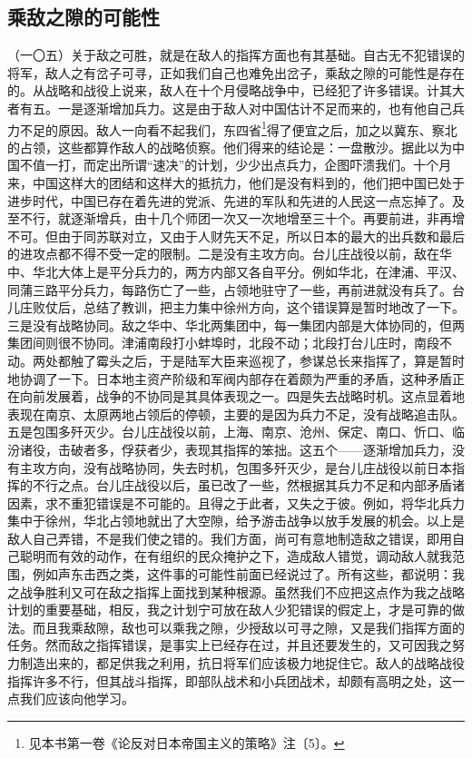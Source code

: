 \documentclass[cn,11pt,chinese]{elegantbook}
\def\myformat#1{\hfil\hfil #1}
\begin{document}
\subsection*{\myformat{乘敌之隙的可能性}}
（一〇五）关于敌之可胜，就是在敌人的指挥方面也有其基础。自古无不犯错误的将军，敌人之有岔子可寻，正如我们自己也难免出岔子，乘敌之隙的可能性是存在的。从战略和战役上说来，敌人在十个月侵略战争中，已经犯了许多错误。计其大者有五。一是逐渐增加兵力。这是由于敌人对中国估计不足而来的，也有他自己兵力不足的原因。敌人一向看不起我们，东四省\footnote[40]{ 见本书第一卷《论反对日本帝国主义的策略》注〔5〕。}得了便宜之后，加之以冀东、察北的占领，这些都算作敌人的战略侦察。他们得来的结论是：一盘散沙。据此以为中国不值一打，而定出所谓“速决”的计划，少少出点兵力，企图吓溃我们。十个月来，中国这样大的团结和这样大的抵抗力，他们是没有料到的，他们把中国已处于进步时代，中国已存在着先进的党派、先进的军队和先进的人民这一点忘掉了。及至不行，就逐渐增兵，由十几个师团一次又一次地增至三十个。再要前进，非再增不可。但由于同苏联对立，又由于人财先天不足，所以日本的最大的出兵数和最后的进攻点都不得不受一定的限制。二是没有主攻方向。台儿庄战役以前，敌在华中、华北大体上是平分兵力的，两方内部又各自平分。例如华北，在津浦、平汉、同蒲三路平分兵力，每路伤亡了一些，占领地驻守了一些，再前进就没有兵了。台儿庄败仗后，总结了教训，把主力集中徐州方向，这个错误算是暂时地改了一下。三是没有战略协同。敌之华中、华北两集团中，每一集团内部是大体协同的，但两集团间则很不协同。津浦南段打小蚌埠时，北段不动；北段打台儿庄时，南段不动。两处都触了霉头之后，于是陆军大臣来巡视了，参谋总长来指挥了，算是暂时地协调了一下。日本地主资产阶级和军阀内部存在着颇为严重的矛盾，这种矛盾正在向前发展着，战争的不协同是其具体表现之一。四是失去战略时机。这点显着地表现在南京、太原两地占领后的停顿，主要的是因为兵力不足，没有战略追击队。五是包围多歼灭少。台儿庄战役以前，上海、南京、沧州、保定、南口、忻口、临汾诸役，击破者多，俘获者少，表现其指挥的笨拙。这五个——逐渐增加兵力，没有主攻方向，没有战略协同，失去时机，包围多歼灭少，是台儿庄战役以前日本指挥的不行之点。台儿庄战役以后，虽已改了一些，然根据其兵力不足和内部矛盾诸因素，求不重犯错误是不可能的。且得之于此者，又失之于彼。例如，将华北兵力集中于徐州，华北占领地就出了大空隙，给予游击战争以放手发展的机会。以上是敌人自己弄错，不是我们使之错的。我们方面，尚可有意地制造敌之错误，即用自己聪明而有效的动作，在有组织的民众掩护之下，造成敌人错觉，调动敌人就我范围，例如声东击西之类，这件事的可能性前面已经说过了。所有这些，都说明：我之战争胜利又可在敌之指挥上面找到某种根源。虽然我们不应把这点作为我之战略计划的重要基础，相反，我之计划宁可放在敌人少犯错误的假定上，才是可靠的做法。而且我乘敌隙，敌也可以乘我之隙，少授敌以可寻之隙，又是我们指挥方面的任务。然而敌之指挥错误，是事实上已经存在过，并且还要发生的，又可因我之努力制造出来的，都足供我之利用，抗日将军们应该极力地捉住它。敌人的战略战役指挥许多不行，但其战斗指挥，即部队战术和小兵团战术，却颇有高明之处，这一点我们应该向他学习。\\
\end{document}
